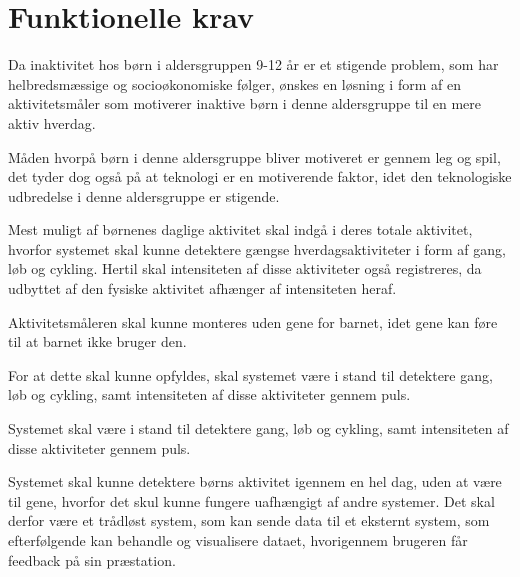 \section{Funktionelle krav}

%
%
Da inaktivitet hos børn i aldersgruppen 9-12 år er et stigende problem, som har helbredsmæssige og socioøkonomiske følger, ønskes en løsning i form af en aktivitetsmåler som motiverer inaktive børn i denne aldersgruppe til en mere aktiv hverdag. 

Måden hvorpå børn i denne aldersgruppe bliver motiveret er gennem leg og spil, det tyder dog også på at teknologi er en motiverende faktor, idet den teknologiske udbredelse i denne aldersgruppe er stigende.

Mest muligt af børnenes daglige aktivitet skal indgå i deres totale aktivitet, hvorfor systemet skal kunne detektere gængse hverdagsaktiviteter i form af gang, løb og cykling. Hertil skal intensiteten af disse aktiviteter også registreres, da udbyttet af den fysiske aktivitet afhænger af intensiteten heraf. 

Aktivitetsmåleren skal kunne monteres uden gene for barnet, idet gene kan føre til at barnet ikke bruger den.


For at dette skal kunne opfyldes, skal systemet være i stand til detektere gang, løb og cykling, samt intensiteten af disse aktiviteter gennem puls. %

Systemet skal være i stand til detektere gang, løb og cykling, samt intensiteten af disse aktiviteter gennem puls.

Systemet skal kunne detektere børns aktivitet igennem en hel dag, uden at være til gene, hvorfor det skul kunne fungere uafhængigt af andre systemer. Det skal derfor være et trådløst system, som kan sende data til et eksternt system, som efterfølgende kan behandle og visualisere dataet, hvorigennem brugeren får feedback på sin præstation.  

